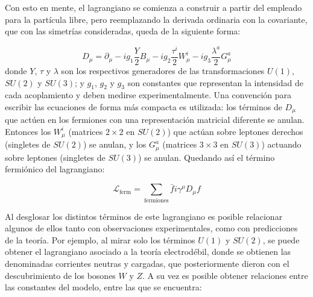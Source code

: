 Con esto en mente, el lagrangiano se comienza a construir a partir del empleado para la partícula libre, pero reemplazando la derivada ordinaria con la covariante, que con las simetrías consideradas, queda de la siguiente forma:


\begin{equation}
D_{\mu} = \partial_{\mu} - i g_{1} \frac{Y}{2}B_{\mu} - i g_{2} \frac{\tau^{i}}{2}W_{\mu}^{i} - i g_{3} \frac{\lambda^{a}}{2}G_{\mu}^{a}
\end{equation}
%
donde $Y$, $\tau$ y $\lambda$ son los respectivos generadores de las transformaciones $U(1)$, $SU(2)$ y $SU(3)$; y $g_1$, $g_2$ y $g_3$ son constantes que representan la intensidad de cada acoplamiento y deben medirse experimentalmente. Una convención para escribir las ecuaciones de forma más compacta es utilizada: los términos de $D_{\mu}$ que actúen en los fermiones con una representación matricial diferente se anulan. Entonces los $W_{\mu}^{i}$ (matrices $2\times2$ en $SU(2)$) que actúan sobre leptones derechos (singletes de $SU(2)$) se anulan, y los $G_{\mu}^{a}$ (matrices $3\times3$ en $SU(3)$) actuando sobre leptones (singletes de $SU(3)$) se anulan. Quedando así el término fermiónico del lagrangiano:

\begin{equation}
\mathcal{L}_{\text{ferm}} = \sum_{\text{fermiones}} \bar{f}i\gamma^{\mu}D_{\mu}f
\end{equation}

Al desglosar los distintos términos de este lagrangiano es posible relacionar algunos de ellos tanto con observaciones experimentales, como con predicciones de la teoría. Por ejemplo, al mirar solo los términos $U(1)$ y $SU(2)$, se puede obtener el lagrangiano asociado a la teoría electrodébil, donde se obtienen las denominadas corrientes neutras y cargadas, que posteriormente dieron con el descubrimiento de los bosones $W$ y $Z$. A su vez es posible obtener relaciones entre las constantes del modelo, entre las que se encuentra:



